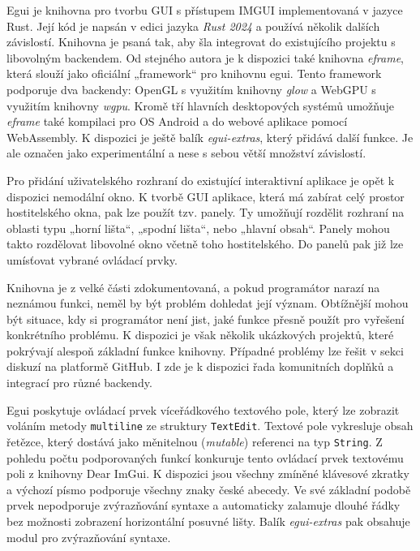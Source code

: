\documentclass[FM,DP]{tulthesis}
\begin{document}
	Egui \cite{online_eguidocs} je knihovna pro tvorbu GUI s přístupem IMGUI implementovaná v jazyce Rust. Její kód je napsán v edici jazyka \textit{Rust 2024} a používá několik dalších závislostí. Knihovna je psaná tak, aby šla integrovat do
	existujícího projektu s libovolným backendem. Od stejného autora je k dispozici také knihovna \textit{eframe}, která slouží jako oficiální „framework“ pro knihovnu egui. Tento framework podporuje dva backendy: OpenGL s využitím knihovny \textit{glow} a WebGPU s využitím knihovny \textit{wgpu}. Kromě tří hlavních desktopových systémů umožňuje \textit{eframe} také kompilaci pro OS Android a do webové aplikace pomocí WebAssembly. K dispozici je ještě balík \textit{egui-extras}, který přidává další funkce. Je ale označen jako experimentální a nese s sebou větší množství závislostí.
	
	Pro přidání uživatelského rozhraní do existující interaktivní aplikace je opět k dispozici nemodální okno. K tvorbě GUI aplikace, která má zabírat celý prostor hostitelského okna, pak lze použít tzv. panely. Ty umožňují rozdělit rozhraní na oblasti typu „horní lišta“, „spodní lišta“, nebo „hlavní obsah“. Panely mohou takto rozdělovat libovolné okno včetně toho hostitelského. Do panelů pak již lze umísťovat vybrané ovládací prvky.
	
	Knihovna je z velké části zdokumentovaná, a pokud programátor narazí na neznámou funkci, neměl by být problém dohledat její význam. Obtížnější mohou být situace, kdy si programátor není jist, jaké funkce přesně použít pro vyřešení konkrétního problému. K dispozici je však několik ukázkových projektů, které pokrývají alespoň základní funkce knihovny. Případné problémy lze řešit v sekci diskuzí na platformě GitHub. I zde je k dispozici řada komunitních doplňků a integrací pro různé backendy.
	
	Egui poskytuje ovládací prvek víceřádkového textového pole, který lze zobrazit voláním metody \texttt{multiline} ze struktury \texttt{TextEdit}. Textové pole vykresluje obsah řetězce, který dostává jako měnitelnou (\textit{mutable}) referenci na typ \texttt{String}. Z pohledu počtu podporovaných funkcí konkuruje tento ovládací prvek textovému poli z knihovny Dear ImGui. K dispozici jsou všechny zmíněné klávesové \mbox{zkratky} a \mbox{výchozí} písmo podporuje všechny znaky české abecedy. Ve své základní podobě prvek nepodporuje zvýrazňování syntaxe a automaticky zalamuje dlouhé řádky bez možnosti zobrazení horizontální posuvné lišty. Balík \textit{egui-extras} pak obsahuje modul pro zvýrazňování syntaxe.
	
\end{document}
